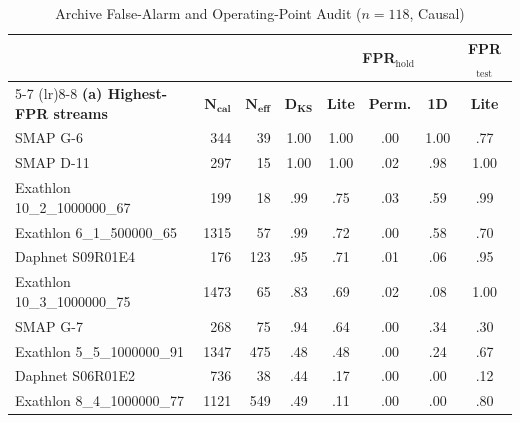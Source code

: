 \begin{table}[t]
\centering
\scriptsize
\setlength{\tabcolsep}{1.0pt}
\caption{Archive False-Alarm and Operating-Point Audit ($n{=}118$, Causal)\label{tab:tail_audit}}
\begin{tabular*}{\columnwidth}{@{\extracolsep{\fill}} l r r c cccc @{}}
\toprule
& & & & \multicolumn{3}{c}{\textbf{FPR$_{\text{hold}}$}} & \textbf{FPR$_{\text{test}}$} \\
\cmidrule(lr){5-7} \cmidrule(lr){8-8}
\textbf{(a) Highest-FPR streams} & {$\boldsymbol{N_{\text{cal}}}$} & {$\boldsymbol{N_{\text{eff}}}$} & {$\boldsymbol{D_{\text{KS}}}$} & \textbf{Lite} & \textbf{Perm.} & \textbf{1D} & \textbf{Lite} \\
\midrule
SMAP G-6                     & 344  & 39  & 1.00 & 1.00 & .00 & 1.00 & .77 \\
SMAP D-11                    & 297  & 15  & 1.00 & 1.00 & .02 & .98  & 1.00 \\
Exathlon 10\_2\_1000000\_67  & 199  & 18  & .99  & .75  & .03 & .59  & .99 \\
Exathlon 6\_1\_500000\_65    & 1315 & 57  & .99  & .72  & .00 & .58  & .70 \\
Daphnet S09R01E4             & 176  & 123 & .95  & .71  & .01 & .06  & .95 \\
Exathlon 10\_3\_1000000\_75  & 1473 & 65  & .83  & .69  & .02 & .08  & 1.00 \\
SMAP G-7                     & 268  & 75  & .94  & .64  & .00 & .34  & .30 \\
Exathlon 5\_5\_1000000\_91   & 1347 & 475 & .48  & .48  & .00 & .24  & .67 \\
Daphnet S06R01E2             & 736  & 38  & .44  & .17  & .00 & .00  & .12 \\
Exathlon 8\_4\_1000000\_77   & 1121 & 549 & .49  & .11  & .00 & .00  & .80 \\
\bottomrule
\end{tabular*}


\end{table}
